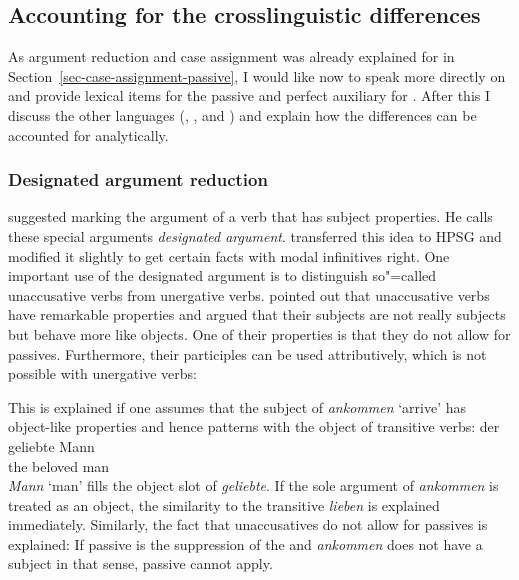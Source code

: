 




\subsection{Accounting for the crosslinguistic differences}

As argument reduction and case assignment was already explained for  in
Section~\ref{sec-case-assignment-passive}, I would like now to speak more directly on and provide 
lexical items for the passive and perfect auxiliary for . After this I discuss the other
languages (\eg {}, , and ) and explain how the differences can be accounted for analytically.

\subsubsection{Designated argument reduction}

\largerpage
\citet[]{Haider86} suggested marking the argument of a verb that has subject properties. He calls
these special arguments \emph{designated argument}. \citet{HM94a} transferred this idea to HPSG and
\citet{Mueller2003e} modified it slightly to get certain facts with modal infinitives
right. One important use of the designated argument is to distinguish so"=called
unaccusative verbs from unergative verbs. \citet{Perlmutter78} pointed out that unaccusative verbs
have remarkable properties and argued that their subjects are not really subjects but behave more
like objects. One of their properties is that they do not allow for passives. Furthermore, their
participles can be used attributively, which is not possible with unergative verbs:

\eal
{}
\zl

\noindent
This is explained if one assumes that the subject of \emph{ankommen} `arrive' has object-like
properties and hence patterns with the object of transitive verbs:
\ea
\gll der geliebte Mann\\
     the beloved  man\\
\z
\emph{Mann} `man' fills the object slot of \emph{geliebte}. If the sole argument of \emph{ankommen}
is treated as an object, the similarity to the transitive \emph{lieben} is explained
immediately. Similarly, the fact that unaccusatives do not allow for passives is explained: If
passive is the suppression of the  and \emph{ankommen} does not have a subject in that sense,
passive cannot apply.

